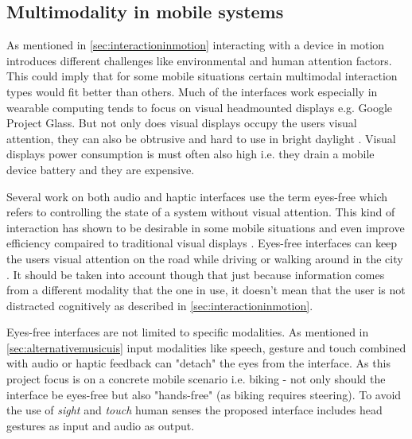 \subsection{Multimodality in mobile systems}
As mentioned in \ref{sec:interactioninmotion} interacting with a device in motion introduces different challenges like environmental and human attention factors. This could imply that for some mobile situations certain multimodal interaction types would fit better than others. Much of the interfaces work especially in wearable computing tends to focus on visual headmounted displays \cite{barfield_fundamentals_2000} e.g. Google Project Glass. But not only does visual displays occupy the users visual attention, they can also be obtrusive and hard to use in bright daylight \cite{geelhoed_safety_2000}. Visual displays power consumption is must often also high i.e. they drain a mobile device battery and they are expensive.

Several work on both audio \cite{kajastila_eyes-free_2013,bonner_no-look_2010,brewster_multimodal_2003,zhao_earpod:_2007,vazquez-alvarez_eyes-free_2011} and haptic \cite{pasquero_haptic_2011,pielot_tactile_2011} interfaces use the term eyes-free which refers to controlling the state of a system without visual attention. This kind of interaction has shown to be desirable in some mobile situations \cite{oakley_designing_2007,yi_exploring_2012} and even improve efficiency compaired to traditional visual displays \cite{zhao_earpod:_2007}. Eyes-free interfaces can keep the users visual attention on the road while driving \cite{sodnik_user_2008} or walking around in the city \cite{vazquez-alvarez_eyes-free_2011}. It should be taken into account though that just because information comes from a different modality that the one in use, it doesn't mean that the user is not distracted cognitively as described in \ref{sec:interactioninmotion}.

Eyes-free interfaces are not limited to specific modalities. As mentioned in \ref{sec:alternativemusicuis} input modalities like speech, gesture and touch combined with audio or haptic feedback can "detach" the eyes from the interface. As this project focus is on a concrete mobile scenario i.e. biking - not only should the interface be eyes-free but also "hands-free" (as biking requires steering). To avoid the use of \textit{sight} and \textit{touch} human senses the proposed interface includes head gestures as input and audio as output.

